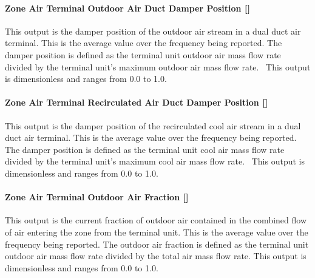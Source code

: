 \paragraph{Zone Air Terminal Outdoor Air Duct Damper Position {[]}}\label{zone-air-terminal-outdoor-air-duct-damper-position}

This output is the damper position of the outdoor air stream in a dual duct air terminal. This is the average value over the frequency being reported. The damper position is defined as the terminal unit outdoor air mass flow rate divided by the terminal unit's maximum outdoor air mass flow rate.~ This output is dimensionless and ranges from 0.0 to 1.0.

\paragraph{Zone Air Terminal Recirculated Air Duct Damper Position {[]}}\label{zone-air-terminal-recirculated-air-duct-damper-position}

This output is the damper position of the recirculated cool air stream in a dual duct air terminal. This is the average value over the frequency being reported. The damper position is defined as the terminal unit cool air mass flow rate divided by the terminal unit's maximum cool air mass flow rate.~ This output is dimensionless and ranges from 0.0 to 1.0.

\paragraph{Zone Air Terminal Outdoor Air Fraction {[]}}\label{zone-air-terminal-outdoor-air-fraction}

This output is the current fraction of outdoor air contained in the combined flow of air entering the zone from the terminal unit. This is the average value over the frequency being reported. The outdoor air fraction is defined as the terminal unit outdoor air mass flow rate divided by the total air mass flow rate. This output is dimensionless and ranges from 0.0 to 1.0.
